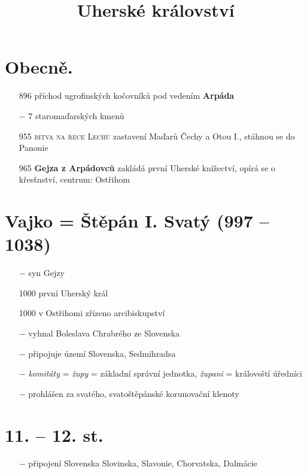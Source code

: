 \documentclass{article}
\title{\vspace{-2cm}Uherské království\vspace{-1.7cm}}
\date{}
\author{}
\begin{document}
\maketitle

\section*{Obecně.}
\begin{itemize}
    \vspace{-0.5em}
    \setlength\itemsep{0.15em}
    \item[896] příchod ugrofinských kočovníků pod vedením \textbf{Arpáda}
    \item[$-$] 7 staromaďarských kmenů
    \item[955] \textsc{bitva na řece Lechu} zastavení Maďarů Čechy a Otou I., stáhnou se do Panonie
    \item[965] \textbf{Gejza z Arpádovců} zakládá první Uherské knížectví, opírá se o křesťnství, centrum: Ostřihom
\end{itemize}

\section*{Vajko = Štěpán I. Svatý (997 -- 1038)}
\begin{itemize}
    \vspace{-0.5em}
    \setlength\itemsep{0.15em}
    \item[$-$] syn Gejzy
    \item[1000] první Uherský král
    \item[1000] v Ostřihomi zřízeno arcibiskupství
    \item[$-$] vyhnal Boleslava Chrabrého ze Slovenska
    \item[$-$] připojuje území Slovenska, Sedmihradsa
    \item[$-$] \textit{komitáty} = \textit{župy} = základní správní jednotka, \textit{župani} = královsští úředníci
    \item[$-$] prohlášen za svatého, svatoštěpánské korunovační klenoty
\end{itemize}

\section*{11. -- 12. st.}
\begin{itemize}
    \vspace{-0.5em}
    \setlength\itemsep{0.15em}
    \item[$-$] připojení Slovenska Slovinska, Slavonie, Chorvatska, Dalmácie
\end{itemize}
\end{document}
